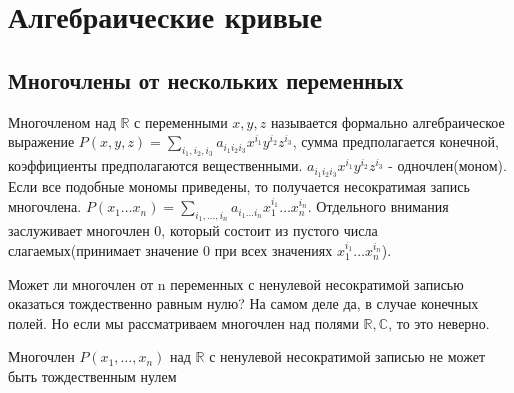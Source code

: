 \section{Алгебраические кривые}

\subsection{Многочлены от нескольких переменных}

\begin{definition}
	Многочленом над $\mathbb{R}$ с переменными \(x, y, z\) называется формально алгебраическое выражение \(P(x,y,z) = \sum_{i_1, i_2, i_3} a_{i_1i_2i_3}x^{i_1}y^{i_2}z^{i_3}\), сумма предполагается конечной, коэффициенты предполагаются вещественными. \newline
	\(a_{i_1i_2i_3}x^{i_1}y^{i_2}z^{i_3}\) - одночлен(моном). Если все подобные мономы приведены, то получается несократимая запись многочлена. \newline
	\(P(x_1\ldots x_n) = \sum_{i_1,\ldots,i_n}a_{i_1\ldots i_n}x_1^{i_1} \ldots x_n^{i_n}\). Отдельного внимания заслуживает многочлен 0, который состоит из пустого числа слагаемых(принимает значение 0 при всех значениях \(x_1^{i_1}\ldots x_n^{i_n}\)).
\end{definition}
Может ли многочлен от n переменных с ненулевой несократимой записью оказаться тождественно равным нулю? На самом деле да, в случае конечных полей. Но если мы рассматриваем многочлен над полями \(\mathbb{R}, \mathbb{C}\), то это неверно.
\begin{proposition}
	Многочлен $P(x_1, \dots, x_n)$ над \(\mathbb{R}\) с ненулевой несократимой записью не может быть тождественным нулем
\end{proposition}
